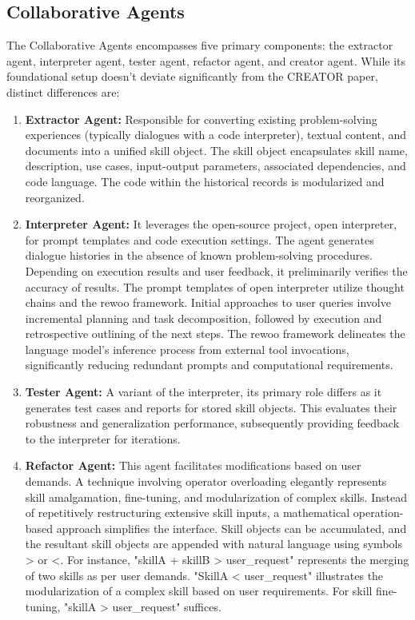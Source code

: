 \subsection{Collaborative Agents}

The Collaborative Agents encompasses five primary components: the extractor agent, interpreter agent, tester agent, refactor agent, and creator agent. While its foundational setup doesn't deviate significantly from the CREATOR paper, distinct differences are:

\begin{enumerate}
    \item \textbf{Extractor Agent:} Responsible for converting existing problem-solving experiences (typically dialogues with a code interpreter), textual content, and documents into a unified skill object. The skill object encapsulates skill name, description, use cases, input-output parameters, associated dependencies, and code language. The code within the historical records is modularized and reorganized.
    
    \item \textbf{Interpreter Agent:} It leverages the open-source project, open interpreter, for prompt templates and code execution settings. The agent generates dialogue histories in the absence of known problem-solving procedures. Depending on execution results and user feedback, it preliminarily verifies the accuracy of results. The prompt templates of open interpreter utilize thought chains and the rewoo framework. Initial approaches to user queries involve incremental planning and task decomposition, followed by execution and retrospective outlining of the next steps. The rewoo framework delineates the language model's inference process from external tool invocations, significantly reducing redundant prompts and computational requirements.
    
    \item \textbf{Tester Agent:} A variant of the interpreter, its primary role differs as it generates test cases and reports for stored skill objects. This evaluates their robustness and generalization performance, subsequently providing feedback to the interpreter for iterations.
    
    \item \textbf{Refactor Agent:} This agent facilitates modifications based on user demands. A technique involving operator overloading elegantly represents skill amalgamation, fine-tuning, and modularization of complex skills. Instead of repetitively restructuring extensive skill inputs, a mathematical operation-based approach simplifies the interface. Skill objects can be accumulated, and the resultant skill objects are appended with natural language using symbols > or <. For instance, "skillA + skillB > user\_request" represents the merging of two skills as per user demands. "SkillA < user\_request" illustrates the modularization of a complex skill based on user requirements. For skill fine-tuning, "skillA > user\_request" suffices.
    

\end{enumerate}
